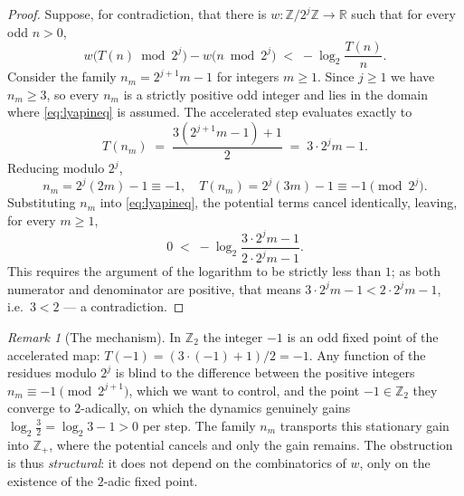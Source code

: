 \documentclass[11pt]{amsart}
\theoremstyle{definition}
\theoremstyle{remark}
\newtheorem{remark}[theorem]{Remark}
\newcommand{\Z}{\mathbb{Z}}
\newcommand{\R}{\mathbb{R}}
\newcommand{\Ztwo}{\Z_2}
\begin{document}
\begin{proof}
Suppose, for contradiction, that there is $w : \Z/2^j\Z \to \R$ such that for every odd $n > 0$,
\begin{equation}\label{eq:lyapineq}
w\bigl(T(n) \bmod 2^j\bigr) - w\bigl(n \bmod 2^j\bigr) \;<\; -\log_2 \frac{T(n)}{n}.
\end{equation}
Consider the family $n_m = 2^{j+1}m - 1$ for integers $m \ge 1$. Since $j \ge 1$ we have $n_m \ge 3$, so every $n_m$ is a strictly positive odd integer and lies in the domain where \eqref{eq:lyapineq} is assumed. The accelerated step evaluates exactly to
\[
T(n_m) \;=\; \frac{3(2^{j+1}m-1)+1}{2} \;=\; 3\cdot 2^j m - 1 .
\]
Reducing modulo $2^j$,
\[
n_m = 2^j(2m) - 1 \equiv -1 , \quad
T(n_m) = 2^j(3m) - 1 \equiv -1 \pmod{2^j}.
\]
Substituting $n_m$ into \eqref{eq:lyapineq}, the potential terms cancel identically, leaving, for every $m \ge 1$,
\[
0 \;<\; -\log_2 \frac{3\cdot 2^j m - 1}{2\cdot 2^j m - 1}.
\]
This requires the argument of the logarithm to be strictly less than $1$; as both numerator and denominator are positive, that means $3\cdot 2^j m - 1 < 2\cdot 2^j m - 1$, i.e.\ $3 < 2$ --- a contradiction.
\end{proof}

\begin{remark}[The mechanism]\label{rem:mechanism}
In $\Ztwo$ the integer $-1$ is an odd fixed point of the accelerated map: $T(-1) = (3\cdot(-1)+1)/2 = -1$. Any function of the residues modulo $2^j$ is blind to the difference between the positive integers $n_m \equiv -1 \pmod{2^{j+1}}$, which we want to control, and the point $-1 \in \Ztwo$ they converge to $2$-adically, on which the dynamics genuinely gains $\log_2 \frac32 = \log_2 3 - 1 > 0$ per step. The family $n_m$ transports this stationary gain into $\Z_+$, where the potential cancels and only the gain remains. The obstruction is thus \emph{structural}: it does not depend on the combinatorics of $w$, only on the existence of the $2$-adic fixed point.
\end{remark}
\end{document}
